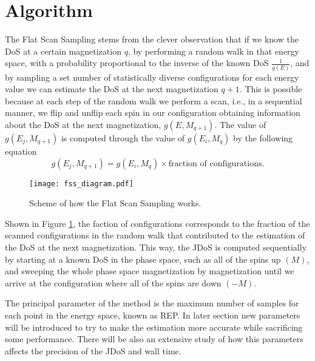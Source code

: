 \section{Algorithm}

	The Flat Scan Sampling stems from the clever observation that if we know the DoS at a certain magnetization $q$, by performing a random walk in that energy space, with a probability proportional to the inverse of the known DoS $\frac{1}{g(E)}$, and by sampling a set number of statistically diverse configurations for each energy value we can estimate the DoS at the next magnetization $q+1$. 
This is possible because at each step of the random walk we perform a scan, i.e., in a sequential manner, we flip and unflip each spin in our configuration obtaining information about the DoS at the next magnetization, $g(E, M_{q+1})$. 
The value of $g(E_j, M_{q+1})$ is computed through the value of $g(E_i, M_q)$ by the following equation
\begin{equation}\label{eq:FSS_JDoS}
	g(E_j, M_{q+1}) = g(E_i, M_q) \times \text{fraction of configurations}.
\end{equation}

\begin{figure}[h]
	\centering
	\texttt{[image: fss\_diagram.pdf]}
	\caption{Scheme of how the Flat Scan Sampling works.}
	\label{fss_dia}
\end{figure}

Shown in Figure \ref{fss_dia}, the faction of configurations corresponds to the fraction of the scanned configurations in the random walk that contributed to the estimation of the DoS at the next magnetization. This way, the JDoS is computed sequentially by starting at a known DoS in the phase space, such as all of the spins up $(M)$, and sweeping the whole phase space magnetization by magnetization until we arrive at the configuration where all of the spins are down $(-M)$.

The principal parameter of the method is the maximum number of samples for each point in the energy space, known as REP. In later section new parameters will be introduced to try to make the estimation more accurate while sacrificing some performance.  There will be also an extensive study of how this parameters affects the precision of the JDoS and wall time.

